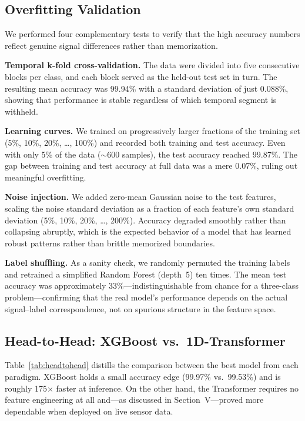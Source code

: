 \documentclass[conference,a4paper]{IEEEtran}
\begin{document}
\subsection{Overfitting Validation}

We performed four complementary tests to verify that the high accuracy numbers reflect genuine signal differences rather than memorization.

\textbf{Temporal k-fold cross-validation.} The data were divided into five consecutive blocks per class, and each block served as the held-out test set in turn. The resulting mean accuracy was 99.94\% with a standard deviation of just 0.088\%, showing that performance is stable regardless of which temporal segment is withheld.

\textbf{Learning curves.} We trained on progressively larger fractions of the training set (5\%, 10\%, 20\%, \ldots, 100\%) and recorded both training and test accuracy. Even with only 5\% of the data ($\sim$600 samples), the test accuracy reached 99.87\%. The gap between training and test accuracy at full data was a mere 0.07\%, ruling out meaningful overfitting.

\textbf{Noise injection.} We added zero-mean Gaussian noise to the test features, scaling the noise standard deviation as a fraction of each feature's own standard deviation (5\%, 10\%, 20\%, \ldots, 200\%). Accuracy degraded smoothly rather than collapsing abruptly, which is the expected behavior of a model that has learned robust patterns rather than brittle memorized boundaries.

\textbf{Label shuffling.} As a sanity check, we randomly permuted the training labels and retrained a simplified Random Forest (depth~5) ten times. The mean test accuracy was approximately 33\%---indistinguishable from chance for a three-class problem---confirming that the real model's performance depends on the actual signal--label correspondence, not on spurious structure in the feature space.

\subsection{Head-to-Head: XGBoost vs.\ 1D-Transformer}

Table~\ref{tab:headtohead} distills the comparison between the best model from each paradigm. XGBoost holds a small accuracy edge (99.97\% vs.\ 99.53\%) and is roughly 175$\times$ faster at inference. On the other hand, the Transformer requires no feature engineering at all and---as discussed in Section~V---proved more dependable when deployed on live sensor data.
\end{document}
